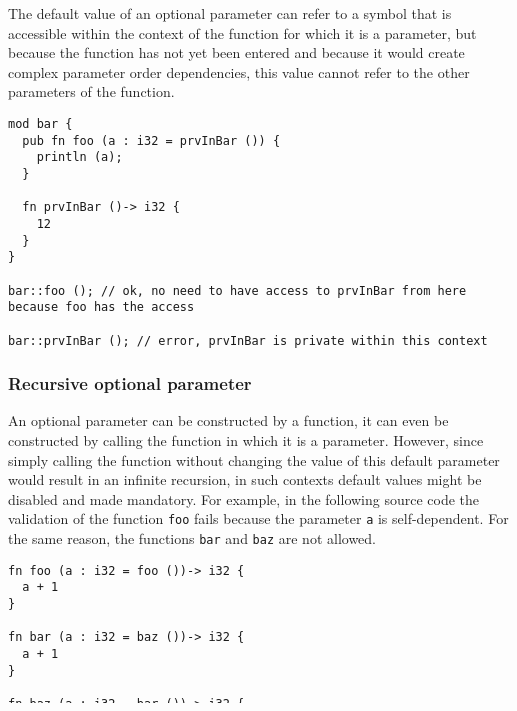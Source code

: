 The default value of an optional parameter can refer to a symbol that is
accessible within the context of the function for which it is a parameter, but
because the function has not yet been entered and because it would create
complex parameter order dependencies, this value cannot refer to the other
parameters of the function.

\begin{lstlisting}[style=coloredverbatim]
mod bar {
  pub fn foo (a : i32 = prvInBar ()) {
    println (a);
  }

  fn prvInBar ()-> i32 {
    12
  }
}

bar::foo (); // ok, no need to have access to prvInBar from here because foo has the access

bar::prvInBar (); // error, prvInBar is private within this context
\end{lstlisting}

\subsubsection{Recursive optional parameter}

An optional parameter can be constructed by a function, it can even be
constructed by calling the function in which it is a parameter. However, since
simply calling the function without changing the value of this default parameter
would result in an infinite recursion, in such contexts default values might be
disabled and made mandatory. For example, in the following source code the
validation of the function \texttt{foo} fails because the parameter \texttt{a}
is self-dependent. For the same reason, the functions \texttt{bar} and
\texttt{baz} are not allowed.

\begin{lstlisting}[style=coloredverbatim]
fn foo (a : i32 = foo ())-> i32 {
  a + 1
}

fn bar (a : i32 = baz ())-> i32 {
  a + 1
}

fn baz (a : i32 = bar ())-> i32 {
  a - 1
}
\end{lstlisting}

To solve this problem, the value of the parameter \texttt{a} can be set inside
the recursive calls. For example, the following code shows a solution for the
functions \texttt{bar} and \texttt{baz}. This fix may seem abrupt, and one could
argue that only one of the two functions needs to stop the infinite recursion.
However, it was decided to force this, as it seems to be a fairly niche problem
that needs to be avoided anyway.

